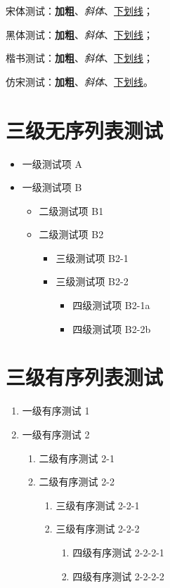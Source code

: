 {\songti 宋体测试：\textbf{加粗}、\textit{斜体}、\underline{下划线}}；\par
{\heiti 黑体测试：\textbf{加粗}、\textit{斜体}、\underline{下划线}}；\par
{\kaishu 楷书测试：\textbf{加粗}、\textit{斜体}、\underline{下划线}}；\par
{\fangsong 仿宋测试：\textbf{加粗}、\textit{斜体}、\underline{下划线}}。

\section{三级无序列表测试}
\begin{itemize}
\item 一级测试项 A
\item 一级测试项 B
    \begin{itemize}
    \item 二级测试项 B1
    \item 二级测试项 B2
        \begin{itemize}
        \item 三级测试项 B2-1
        \item 三级测试项 B2-2
            \begin{itemize}
            \item 四级测试项 B2-1a
            \item 四级测试项 B2-2b
            \end{itemize}
        \end{itemize}
    \end{itemize}
\end{itemize}

\section{三级有序列表测试}
\begin{enumerate}
\item 一级有序测试 1
\item 一级有序测试 2
    \begin{enumerate}
    \item 二级有序测试 2-1
    \item 二级有序测试 2-2
        \begin{enumerate}
        \item 三级有序测试 2-2-1
        \item 三级有序测试 2-2-2
            \begin{enumerate}
            \item 四级有序测试 2-2-2-1
            \item 四级有序测试 2-2-2-2
            \end{enumerate}
        \end{enumerate}
    \end{enumerate}
\end{enumerate}

